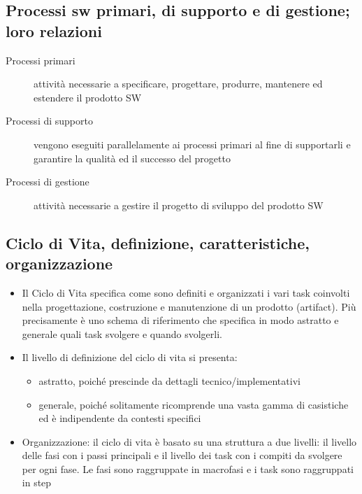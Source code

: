 \subsection{Processi sw primari, di supporto e di gestione; loro relazioni}
\begin{description}
    \item[Processi primari] attività necessarie a specificare, progettare, produrre, mantenere ed estendere il prodotto SW
    \item[Processi di supporto] vengono eseguiti parallelamente ai processi primari al fine di supportarli e garantire la qualità ed il successo del progetto 
    \item[Processi di gestione] attività necessarie a gestire il progetto di sviluppo del prodotto SW
\end{description}
\subsection{Ciclo di Vita, definizione, caratteristiche, organizzazione}
\begin{itemize}
    \item Il Ciclo di Vita specifica come sono definiti e organizzati i vari task coinvolti nella progettazione, costruzione e manutenzione di un prodotto (artifact). Più precisamente è uno schema di riferimento che specifica in modo astratto e generale quali task svolgere e quando svolgerli.
    \item Il livello di definizione del ciclo di vita si presenta:
        \begin{itemize}
            \item astratto, poiché prescinde da dettagli tecnico/implementativi
            \item generale, poiché solitamente ricomprende una vasta gamma di casistiche ed è indipendente da contesti specifici
        \end{itemize}
    \item Organizzazione: il ciclo di vita è basato su una struttura a due livelli: il livello delle fasi con i passi principali e il livello dei task con i compiti da svolgere per ogni fase. Le fasi sono raggruppate in macrofasi e i task sono raggruppati in step
\end{itemize}
